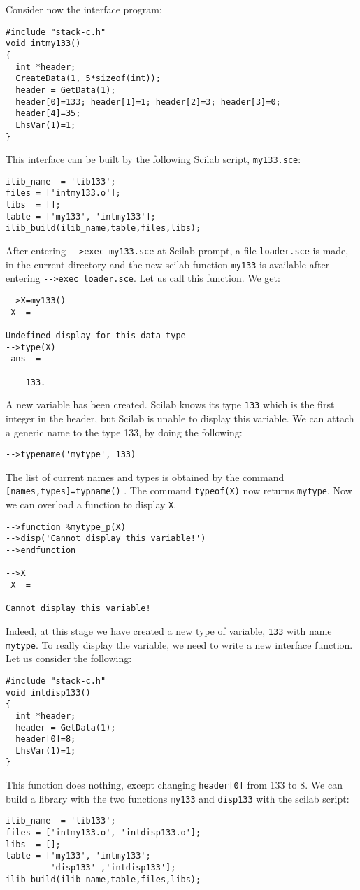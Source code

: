 Consider now the interface program:
\begin{verbatim}
#include "stack-c.h"
void intmy133() 
{
  int *header;
  CreateData(1, 5*sizeof(int));
  header = GetData(1);
  header[0]=133; header[1]=1; header[2]=3; header[3]=0;
  header[4]=35;
  LhsVar(1)=1;
}
\end{verbatim}
This interface can be built by the following Scilab script, \verb!my133.sce!:
\begin{verbatim}
ilib_name  = 'lib133';
files = ['intmy133.o'];
libs  = [];
table = ['my133', 'intmy133'];
ilib_build(ilib_name,table,files,libs);
\end{verbatim}
After entering \verb!-->exec my133.sce! at Scilab prompt, 
a file \verb!loader.sce! is made, in the current directory and the new scilab
function \verb!my133! is available after entering \verb!-->exec loader.sce!.
Let us call this function. We get:
\begin{verbatim}
-->X=my133()
 X  =
 
Undefined display for this data type
-->type(X)
 ans  =
 
    133.  
\end{verbatim}
A new variable has been created. Scilab knows its type \verb!133! which is 
the first integer in the header, but Scilab is unable to display this variable.
We can attach a generic name to the type 133, by doing the following:
\begin{verbatim}
-->typename('mytype', 133)
\end{verbatim}
The list of current names and types is obtained by the command 
\verb![names,types]=typname()! . The command \verb!typeof(X)! now returns
\verb!mytype!.
Now we can overload a function to display \verb!X!.
\begin{verbatim}
-->function %mytype_p(X)
-->disp('Cannot display this variable!')
-->endfunction
 
-->X
 X  =
 
Cannot display this variable!   
\end{verbatim}
Indeed, at this stage we have created a new type of variable, \verb!133! with
name {\tt mytype}. To really display the variable, we need to write a new
interface function.
Let us consider the following:
\begin{verbatim}
#include "stack-c.h"
void intdisp133() 
{
  int *header;
  header = GetData(1);
  header[0]=8; 
  LhsVar(1)=1;
}
\end{verbatim}
This function does nothing, except changing \verb!header[0]! from 133 to
8.
We can build a library with the two functions \verb!my133! and \verb!disp133!
with the scilab script:
\begin{verbatim}
ilib_name  = 'lib133';
files = ['intmy133.o', 'intdisp133.o'];
libs  = [];
table = ['my133', 'intmy133';
         'disp133' ,'intdisp133'];
ilib_build(ilib_name,table,files,libs);
\end{verbatim}

